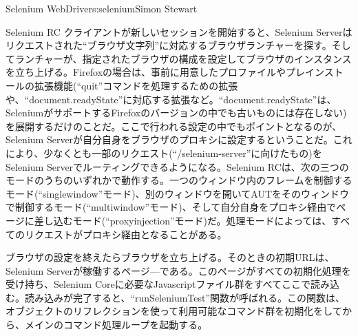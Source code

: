 \begin{aosachapter}{Selenium WebDriver}{s:selenium}{Simon Stewart}
\begin{aosasect1}{Selenium RC}
クライアントが新しいセッションを開始すると、Selenium Serverはリクエストされた``ブラウザ文字列''に対応するブラウザランチャーを探す。そしてランチャーが、指定されたブラウザの構成を設定してブラウザのインスタンスを立ち上げる。Firefoxの場合は、事前に用意したプロファイルやプレインストールの拡張機能(``quit''コマンドを処理するための拡張や、``document.readyState''に対応する拡張など。``document.readyState''は、SeleniumがサポートするFirefoxのバージョンの中でも古いものには存在しない)を展開するだけのことだ。ここで行われる設定の中でもポイントとなるのが、Selenium Serverが自分自身をブラウザのプロキシに設定するということだ。これにより、少なくとも一部のリクエスト(``/selenium-server''に向けたもの)をSelenium Serverでルーティングできるようになる。Selenium RCは、次の三つのモードのうちのいずれかで動作する。一つのウィンドウ内のフレームを制御するモード(``singlewindow''モード)、別のウィンドウを開いてAUTをそのウィンドウで制御するモード(``multiwindow''モード)、そして自分自身をプロキシ経由でページに差し込むモード(``proxyinjection''モード)だ。処理モードによっては、すべてのリクエストがプロキシ経由となることがある。

ブラウザの設定を終えたらブラウザを立ち上げる。そのときの初期URLは、Selenium Serverが稼働するページ---である。このページがすべての初期化処理を受け持ち、Selenium Coreに必要なJavascriptファイル群をすべてここで読み込む。読み込みが完了すると、``runSeleniumTest''関数が呼ばれる。この関数は、オブジェクトのリフレクションを使って利用可能なコマンド群を初期化をしてから、メインのコマンド処理ループを起動する。


\end{aosasect1}
\end{aosachapter}
